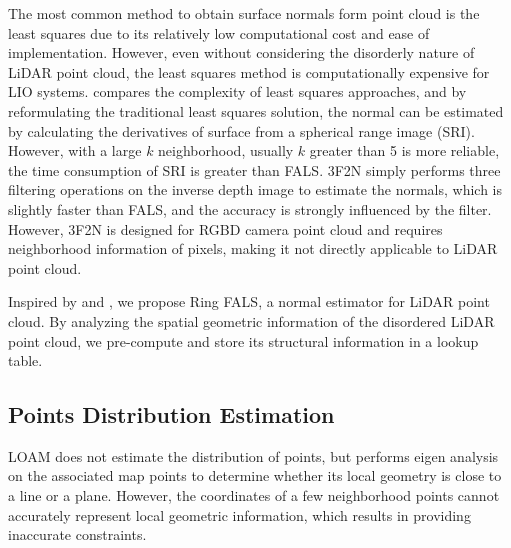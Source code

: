 \documentclass[letterpaper, 10 pt, conference]{ieeeconf}  %
\begin{document}
The most common method to obtain surface normals form point cloud is the least squares due to its relatively low computational cost and ease of implementation\cite{rusu20113d}.
However, even without considering the disorderly nature of LiDAR point cloud, the least squares method is computationally expensive for LIO systems.
\cite{badino2011fast} compares the complexity of least squares approaches, and by reformulating the traditional least squares solution, the normal can be estimated by calculating the derivatives of surface from a spherical range image (SRI).
However, with a large $k$ neighborhood, usually $k$ greater than 5 is more reliable, the time consumption of SRI is greater than FALS.
3F2N\cite{fan2021three} simply performs three filtering operations on the inverse depth image to estimate the normals, which is slightly faster than FALS, and the accuracy is strongly influenced by the filter.
However, 3F2N is designed for RGBD camera point cloud and requires neighborhood information of pixels, making it not directly applicable to LiDAR point cloud.

Inspired by \cite{badino2011fast} and \cite{fan2021three}, we propose Ring FALS, a normal estimator for LiDAR point cloud.
By analyzing the spatial geometric information of the disordered LiDAR point cloud, we pre-compute and store its structural information in a lookup table.

\subsection{Points Distribution Estimation}
LOAM \cite{zhang2014loam} does not estimate the distribution of points, but performs eigen analysis on the associated map points to determine whether its local geometry is close to a line or a plane.
However, the coordinates of a few neighborhood points cannot accurately represent local geometric information, which results in providing inaccurate constraints.
\end{document}
